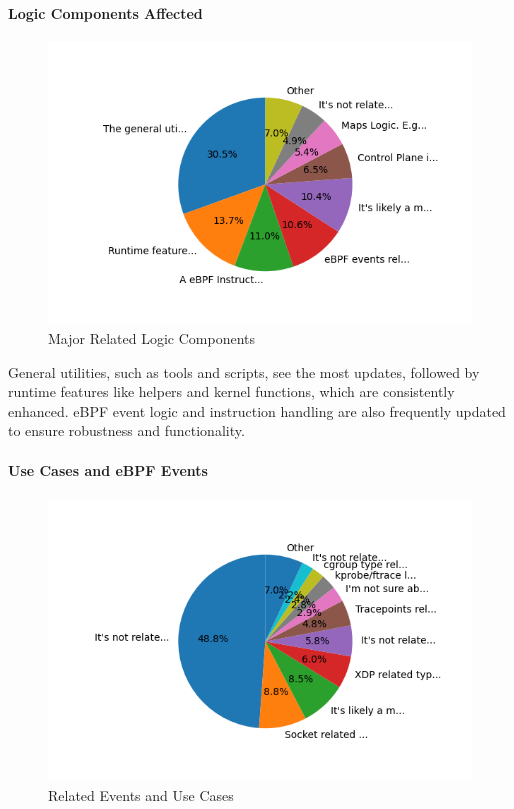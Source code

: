 \paragraph{Logic Components Affected}
\begin{figure}[ht]
    \centering
    \includegraphics[width=\linewidth]{feature-analysis/commit_pie_chart_major_logic_component.png}
    \caption{Major Related Logic Components}
\end{figure}

General utilities, such as tools and scripts, see the most updates, followed by runtime features like helpers and kernel functions, which are consistently enhanced. eBPF event logic and instruction handling are also frequently updated to ensure robustness and functionality.
 
\paragraph{Use Cases and eBPF Events}
\begin{figure}[ht]
    \centering
    \includegraphics[width=\linewidth]{feature-analysis/commit_pie_chart_usecases_or_submodule_events.png}
    \caption{Related Events and Use Cases}
\end{figure}

